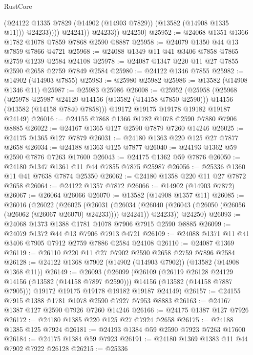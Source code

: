 \begin{lexlean}{RustCore}
\begin{coremodule}
                      (@24122 @1335 @7829 (@14902 (@14903 @7829)) (@13582 (@14908 @1335 @11)))
                      @24233))))
              @24241))
          @24233))
      @24250)
@25952 := @24068 @1351 @1366 @1782 @1078 @7859 @7868 @2590 @8887
@25958 := @24079 @1350 @44 @13 @7859 @7866 @4721
@25968 := @24088 @1349 @11 @41 @3406 @7858 @7865 @2759 @1239 @2584 @24108
@25978 := @24087 @1347 @220 @11 @27 @7855 @2590 @2658 @2759 @7849 @2584
@25980 := @24122 @1346 @7855
@25982 := @14902 (@14903 @7855)
@25983 := @25980 @25982
@25986 := @13582 (@14908 @1346 @11)
@25987 := @25983 @25986
@26008 := @25952
    (@25958
      (@25968
        (@25978 @25987 @24129 @14156 (@13582 (@14158 @7850 @2590)))
        @14156
        (@13582 (@14158 @7840 @7858)))
      @19172
      @19175
      @19178
      @19182
      @19187
      @24149)
@26016 := @24155 @7868 @1366 @1782 @1078 @2590 @7880 @7906 @8885
@26022 := @24167 @1365 @127 @2590 @7879 @7260 @14246
@26025 := @24175 @1365 @127 @7879
@26031 := @24180 @1363 @220 @125 @27 @7877 @2658
@26034 := @24188 @1363 @125 @7877
@26040 := @24193 @1362 @59 @2590 @7876 @7263 @17600
@26043 := @24175 @1362 @59 @7876
@26050 := @24180 @1347 @1361 @11 @44 @7855 @7875 @25987
@26056 := @25336 @1360 @11 @41 @7638 @7874 @25350
@26062 := @24180 @1358 @220 @11 @27 @7872 @2658
@26064 := @24122 @1357 @7872
@26066 := @14902 (@14903 @7872)
@26067 := @26064 @26066
@26070 := @13582 (@14908 @1357 @11)
@26085 := @26016
    (@26022
      (@26025
        (@26031
          (@26034 (@26040 (@26043 (@26050 (@26056 (@26062 (@26067 @26070) @24233)))) @24241))
          @24233))
      @24250)
@26093 := @24068 @1373 @1388 @1781 @1078 @7906 @7915 @2590 @8885
@26099 := @24079 @1372 @44 @13 @7906 @7913 @4721
@26109 := @24088 @1371 @11 @41 @3406 @7905 @7912 @2759 @7886 @2584 @24108
@26110 := @24087 @1369
@26119 := @26110 @220 @11 @27 @7902 @2590 @2658 @2759 @7896 @2584
@26128 := @24122 @1368 @7902 (@14902 (@14903 @7902)) (@13582 (@14908 @1368 @11))
@26149 := @26093
    (@26099
      (@26109
        (@26119 @26128 @24129 @14156 (@13582 (@14158 @7897 @2590)))
        @14156
        (@13582 (@14158 @7887 @7905)))
      @19172
      @19175
      @19178
      @19182
      @19187
      @24149)
@26157 := @24155 @7915 @1388 @1781 @1078 @2590 @7927 @7953 @8883
@26163 := @24167 @1387 @127 @2590 @7926 @7260 @14246
@26166 := @24175 @1387 @127 @7926
@26172 := @24180 @1385 @220 @125 @27 @7924 @2658
@26175 := @24188 @1385 @125 @7924
@26181 := @24193 @1384 @59 @2590 @7923 @7263 @17600
@26184 := @24175 @1384 @59 @7923
@26191 := @24180 @1369 @1383 @11 @44 @7902 @7922 @26128
@26215 := @25336

\end{coremodule}
\end{lexlean}
